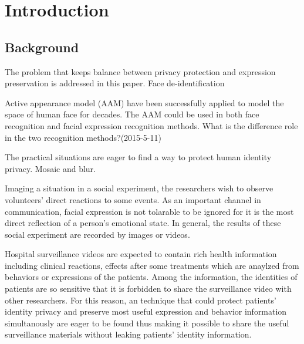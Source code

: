 
\chapter{Introduction}

\section{Background}

The problem that keeps balance between privacy protection and expression preservation is addressed in this paper. 
Face de-identification 

\par
Active appearance model (AAM) have been successfully applied to model the space of human face for decades. The AAM could be used in both face recognition and facial expression recognition methods. What is the difference role in the two recognition methods?(2015-5-11)

\par
The practical situations are eager to find a way to protect human identity privacy. Mosaic and blur.

\par
Imaging a situation in a social experiment, the researchers wish to observe volunteers' direct reactions to some events. As an important channel in communication, facial expression is not tolarable to be ignored for it is the most direct reflection of a person's emotional state. In general, the results of these social experiment are recorded by images or videos. 


\par
Hospital surveillance videos are expected to contain rich health information including clinical reactions, effects after some treatments which are anaylzed from behaviors or expressions of the patients. Among the information, the identities of patients are so sensitive that it is forbidden to share the surveillance video with other researchers. For this reason, an technique that could protect patients' identity privacy and preserve most useful expression and behavior information simultanously are eager to be found thus making it possible to share the useful surveillance materials without leaking patients' identity information.

